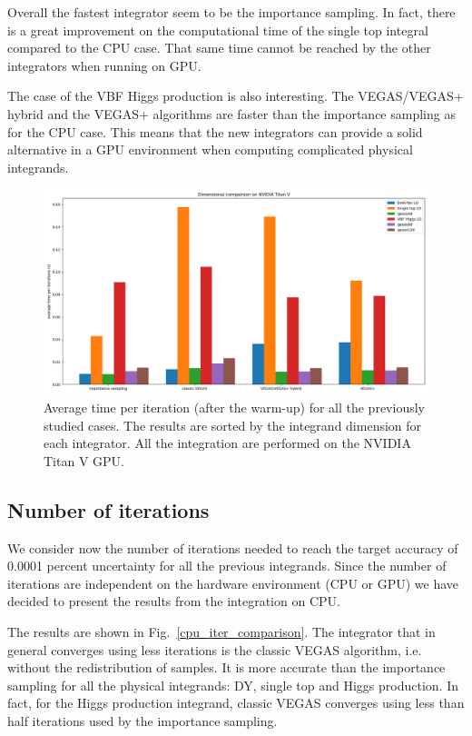 \documentclass[../main/main.tex]{subfiles}
\begin{document}
Overall the fastest integrator seem to be the importance sampling. In fact, there is a great improvement on the computational time of the single top integral compared to the CPU case. That same time cannot be reached by the other integrators when running on GPU.

The case of the VBF Higgs production is also interesting. The VEGAS/VEGAS+ hybrid and the VEGAS+ algorithms are faster than the importance sampling as for the CPU case. This means that the new integrators can provide a solid alternative in a GPU environment when computing complicated physical integrands.

\begin{figure}[h]
	\centering
	\includegraphics[width=\textwidth]{../images/GPU_final.png}
	\caption{Average time per iteration (after the warm-up) for all the previously studied cases. The results are sorted by the integrand dimension for each integrator. All the integration are performed on the NVIDIA Titan V GPU. }
	\label{gpu_time_comparison}
\end{figure}


\subsection{Number of iterations}
We consider now the number of iterations needed to reach the target accuracy of 0.0001 percent uncertainty for all the previous integrands. Since the number of iterations are independent on the hardware environment (CPU or GPU) we have decided to present the results from the integration on CPU. 

The results are shown in Fig.~\ref{cpu_iter_comparison}. The integrator that in general converges
using less iterations is the classic VEGAS algorithm, i.e. without the redistribution of samples. It is more accurate than the importance sampling for all the physical integrands: DY, single top and Higgs production. In fact, for the Higgs production integrand, classic VEGAS converges using less than half iterations used by the importance sampling.
\end{document}
